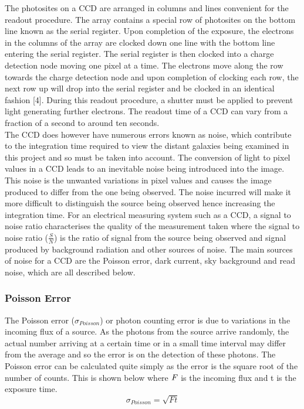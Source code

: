 \documentclass[pdf,color]{UoBnote}
\begin{document}
\newline
The photosites on a CCD are arranged in columns and lines convenient for the readout procedure. The array contains a special row of photosites on the bottom line known as the serial register. Upon completion of the exposure, the electrons in the columns of the array are clocked down one line with the bottom line entering the serial register. The serial register is then clocked into a charge detection node moving one pixel at a time. The electrons move along the row towards the charge detection node and upon completion of clocking each row, the next row up will drop into the serial register and be clocked in an identical fashion [4]. During this readout procedure, a shutter must be applied to prevent light generating further electrons. The readout time of a CCD can vary from a fraction of a second to around ten seconds.\\
\newline 
The CCD does however have numerous errors known as noise, which contribute to the integration time required to view the distant galaxies being examined in this project and so must be taken into account. The conversion of light to pixel values in a CCD leads to an inevitable noise being introduced into the image. This noise is the unwanted variations in pixel values and causes the image produced to differ from the one being observed. The noise incurred will make it more difficult to distinguish the source being observed hence increasing the integration time. For an electrical measuring system such as a CCD, a signal to noise ratio characterises the quality of the measurement taken where the signal to noise ratio ($\frac{S}{N}$) is the ratio of signal from the source being observed and signal produced by background radiation and other sources of noise. The main sources of noise for a CCD are the Poisson error, dark current, sky background and read noise, which are all described below.

\subsubsection{Poisson Error}
The Poisson error ($\sigma$$_{Poisson}$) or photon counting error is due to variations in the incoming flux of a source. As the photons from the source arrive randomly, the actual number arriving at a certain time or in a small time interval may differ from the average and so the error is on the detection of these photons. The Poisson error can be calculated quite simply as the error is the square root of the number of counts. This is shown below where $\it{F}$ is the incoming flux and t is the exposure time.\\
\begin{equation}
\sigma_{Poisson} = \sqrt{Ft}
\end{equation}
\end{document}
